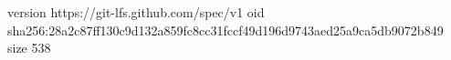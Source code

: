 version https://git-lfs.github.com/spec/v1
oid sha256:28a2c87ff130c9d132a859fc8cc31fccf49d196d9743aed25a9ca5db9072b849
size 538
